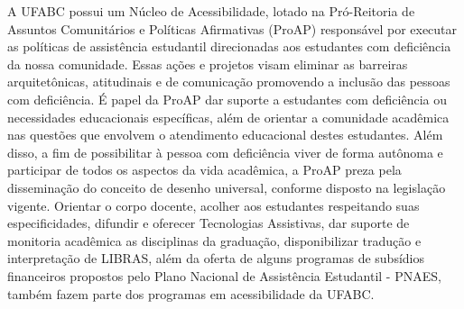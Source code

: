 A UFABC possui um Núcleo de Acessibilidade, lotado na Pró-Reitoria de Assuntos
Comunitários e Políticas Afirmativas (ProAP) responsável por executar as
políticas de assistência estudantil direcionadas aos estudantes com deficiência
da nossa comunidade.
Essas ações e projetos visam eliminar as barreiras arquitetônicas, atitudinais
e de comunicação promovendo a inclusão das pessoas com deficiência. 
É papel da ProAP dar suporte a estudantes com deficiência ou necessidades
educacionais específicas, além de orientar a comunidade acadêmica nas questões
que envolvem o atendimento educacional destes estudantes. 
Além disso, a fim de possibilitar à pessoa com deficiência viver de forma
autônoma e participar de todos os aspectos da vida acadêmica, a ProAP preza
pela disseminação do conceito de desenho universal, conforme disposto na
legislação vigente. 
Orientar o corpo docente, acolher aos estudantes respeitando suas
especificidades, difundir e oferecer Tecnologias Assistivas, dar suporte de
monitoria acadêmica as disciplinas da graduação, disponibilizar tradução e
interpretação de LIBRAS, além da oferta de alguns programas de subsídios
financeiros propostos pelo Plano Nacional de Assistência Estudantil - PNAES,
também fazem parte dos programas em acessibilidade da UFABC. 
